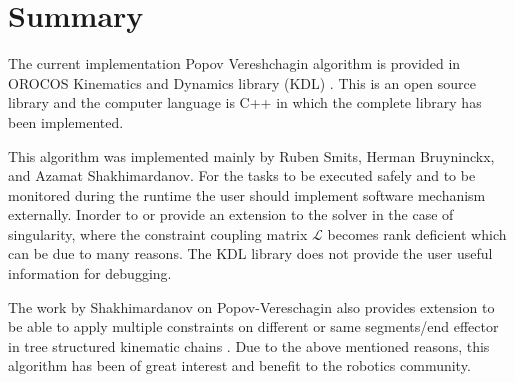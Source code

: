 \begin{itemize}
\end{itemize}
\section{Summary}
The current implementation Popov Vereshchagin algorithm is provided in OROCOS Kinematics and Dynamics library (KDL) \cite{kdl}. This is an open source library and the computer language is C++ in which the complete library has been implemented.


This algorithm was implemented mainly by Ruben Smits, Herman Bruyninckx, and Azamat Shakhimardanov. For the tasks to be executed safely and to be monitored during the runtime the user should implement software mechanism externally. Inorder to or provide an extension to the solver in the case of singularity, where the constraint coupling matrix $\mathcal{L}$ becomes rank deficient which can be due to many reasons. The KDL library does not provide the user useful information for debugging. 


The work by Shakhimardanov on Popov-Vereschagin also provides extension to be able to apply multiple constraints on different or same segments/end effector in tree structured kinematic chains \cite{shakhimardanov2015composable}. Due to the above mentioned reasons, this algorithm has been of great interest and benefit to the robotics community. 

